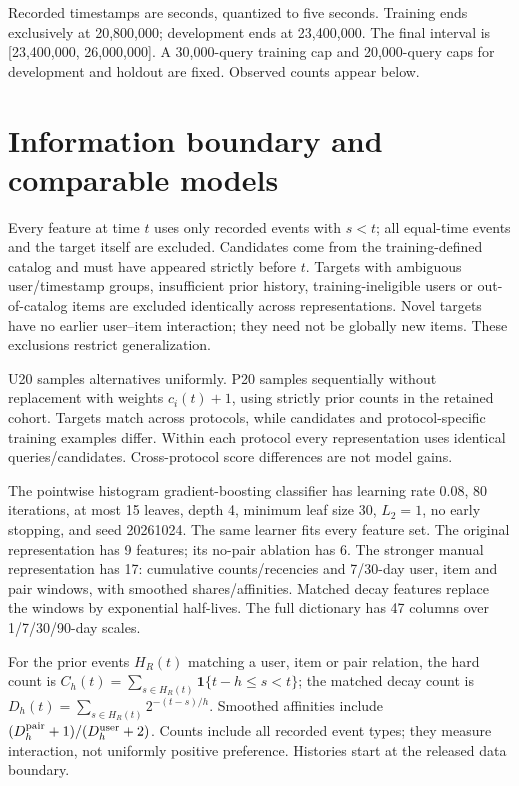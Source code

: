 \documentclass[10pt,a4paper]{article}
\begin{document}
Recorded timestamps are seconds, quantized to five seconds. Training ends
exclusively at 20,800,000; development ends at 23,400,000. The final interval
is [23,400,000, 26,000,000]. A 30,000-query training cap and 20,000-query caps
for development and holdout are fixed. Observed counts appear below.
\clearpage
\section{Information boundary and comparable models}
Every feature at time $t$ uses only recorded events with $s<t$; all equal-time
events and the target itself are excluded. Candidates come from the
training-defined catalog and must have appeared strictly before $t$.
Targets with ambiguous user/timestamp groups, insufficient prior history,
training-ineligible users or out-of-catalog items are excluded identically
across representations. Novel targets have no earlier user--item interaction;
they need not be globally new items. These exclusions restrict generalization.

U20 samples alternatives uniformly. P20 samples sequentially without replacement
with weights $c_i(t)+1$, using strictly prior counts in the retained cohort.
Targets match across protocols, while candidates and protocol-specific training
examples differ. Within each protocol every representation uses identical
queries/candidates. Cross-protocol score differences are not model gains.

The pointwise histogram gradient-boosting classifier has learning rate 0.08,
80 iterations, at most 15 leaves, depth 4, minimum leaf size 30, $L_2=1$,
no early stopping, and seed 20261024. The same learner fits every feature set.
The original representation has 9 features; its no-pair ablation has 6.
The stronger manual representation has 17: cumulative counts/recencies and
7/30-day user, item and pair windows, with smoothed shares/affinities.
Matched decay features replace the windows by exponential half-lives.
The full dictionary has 47 columns over 1/7/30/90-day scales.

For the prior events $H_R(t)$ matching a user, item or pair relation,
the hard count is $C_h(t)=\sum_{s\in H_R(t)}\mathbf{1}\{t-h\leq s<t\}$;
the matched decay count is $D_h(t)=\sum_{s\in H_R(t)}2^{-(t-s)/h}$.
Smoothed affinities include $(D_h^{\rm pair}+1)/(D_h^{\rm user}+2)$.
Counts include all recorded event types; they measure interaction, not
uniformly positive preference. Histories start at the released data boundary.
\end{document}
